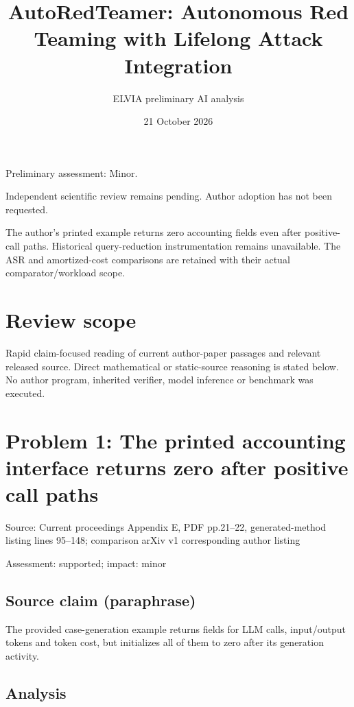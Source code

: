 \documentclass[11pt]{article}
\begin{document}
\title{AutoRedTeamer: Autonomous Red Teaming with Lifelong Attack Integration}

\author{ELVIA preliminary AI analysis}\date{21 October 2026}\maketitle

Preliminary assessment: Minor.\par

Independent scientific review remains pending. Author adoption has not been requested.

The author’s printed example returns zero accounting fields even after positive-call paths. Historical query-reduction instrumentation remains unavailable. The ASR and amortized-cost comparisons are retained with their actual comparator/workload scope.

\section*{Review scope}

Rapid claim-focused reading of current author-paper passages and relevant released source. Direct mathematical or static-source reasoning is stated below. No author program, inherited verifier, model inference or benchmark was executed.

\section*{Problem 1: The printed accounting interface returns zero after positive call paths}

Source: Current proceedings Appendix E, PDF pp.21–22, generated-method listing lines 95–148; comparison arXiv v1 corresponding author listing

Assessment: supported; impact: minor

\subsection*{Source claim (paraphrase)}

The provided case-generation example returns fields for LLM calls, input/output tokens and token cost, but initializes all of them to zero after its generation activity.

\subsection*{Analysis}
\end{document}
